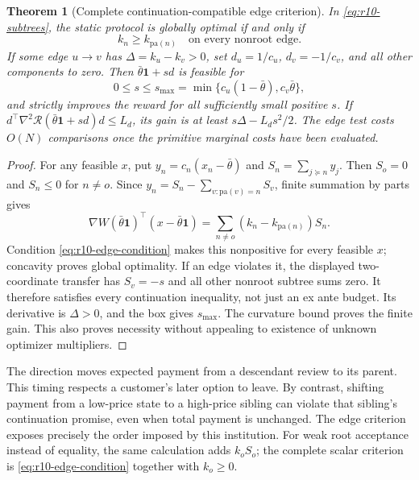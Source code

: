 \documentclass[11pt,letterpaper]{article}
\newtheorem{theorem}{Theorem}[section]
\theoremstyle{definition}
\newcommand{\1}{\mathbf 1}
\begin{document}
\begin{theorem}[Complete continuation-compatible edge criterion]\label{thm:r10-edge}
In \eqref{eq:r10-subtrees}, the static protocol is globally optimal if and only if
\begin{equation}\label{eq:r10-edge-condition}
 k_n\geq k_{\mathrm{pa}(n)}\quad\text{on every nonroot edge}.
\end{equation}
If some edge $u\to v$ has $\Delta=k_u-k_v>0$, set $d_u=1/c_u$, $d_v=-1/c_v$, and all other components to zero. Then $\bar\theta\mathbf1+sd$ is feasible for
\[
 0\leq s\leq s_{\max}=\min\{c_u(1-\bar\theta),c_v\bar\theta\},
\]
and strictly improves the reward for all sufficiently small positive $s$. If $d^\top\nabla^2\mathcal R(\bar\theta\mathbf1+sd)d\leq L_d$, its gain is at least $s\Delta-L_ds^2/2$. The edge test costs $O(N)$ comparisons once the primitive marginal costs have been evaluated.
\end{theorem}
\begin{proof}
For any feasible $x$, put $y_n=c_n(x_n-\bar\theta)$ and $S_n=\sum_{j\succeq n}y_j$. Then $S_o=0$ and $S_n\leq0$ for $n\ne o$. Since $y_n=S_n-\sum_{v:\mathrm{pa}(v)=n}S_v$, finite summation by parts gives
\begin{equation}\label{eq:r10-summation}
 \nabla W(\bar\theta\mathbf1)^\top(x-\bar\theta\mathbf1)
 =\sum_{n\ne o}(k_n-k_{\mathrm{pa}(n)})S_n.
\end{equation}
Condition \eqref{eq:r10-edge-condition} makes this nonpositive for every feasible $x$; concavity proves global optimality. If an edge violates it, the displayed two-coordinate transfer has $S_v=-s$ and all other nonroot subtree sums zero. It therefore satisfies every continuation inequality, not just an ex ante budget. Its derivative is $\Delta>0$, and the box gives $s_{\max}$. The curvature bound proves the finite gain. This also proves necessity without appealing to existence of unknown optimizer multipliers.
\end{proof}

The direction moves expected payment from a descendant review to its parent. This timing respects a customer's later option to leave. By contrast, shifting payment from a low-price state to a high-price sibling can violate that sibling's continuation promise, even when total payment is unchanged. The edge criterion exposes precisely the order imposed by this institution. For weak root acceptance instead of equality, the same calculation adds $k_oS_o$; the complete scalar criterion is \eqref{eq:r10-edge-condition} together with $k_o\geq0$.
\end{document}
